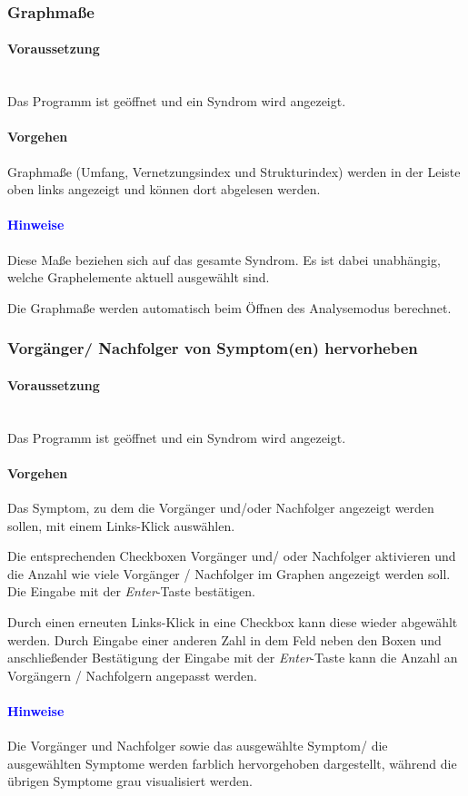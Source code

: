 \documentclass[enabledeprecatedfontcommands,fontsize=11pt,paper=a4,twoside]{scrartcl}
\newcounter{one}
\newcounter{two}[one]
\newcommand*{\hint}{\paragraph{\textcolor{blue}{Hinweise}}}
\newcommand*{\condition}{\paragraph{Voraussetzung}$\;$ \vspace{0.2cm}\\}
\newcommand*{\action}{\paragraph{Vorgehen}}
\let\tempone\itemize
\let\temptwo\enditemize
\renewenvironment{itemize}{\tempone\addtolength{\itemsep}{-10.0pt}}{\temptwo}
\let\origenumerate\enumerate
\let\origendenumerate\endenumerate
\renewenvironment{enumerate}{\origenumerate \addtolength{\itemsep}{-10.0pt}}{\origendenumerate}
\begin{document}
\newpage
\subsubsection{Graphmaße} 
	\condition 
	Das Programm ist geöffnet und ein Syndrom wird angezeigt.
	\action
	\begin{enumerate}
		\item Graphmaße (Umfang, Vernetzungsindex und Strukturindex) werden in der Leiste oben links angezeigt und können dort abgelesen werden.
	\end{enumerate} 
	\hint
	\begin{itemize}
		\item Diese Maße beziehen sich auf das gesamte Syndrom. Es ist dabei unabhängig, welche Graphelemente aktuell ausgewählt sind.
		\item Die Graphmaße werden automatisch beim Öffnen des Analysemodus berechnet. \\
	\end{itemize}

\newpage
\subsubsection{Vorgänger/ Nachfolger von Symptom(en) hervorheben}
	\condition 
		Das Programm ist geöffnet und ein Syndrom wird angezeigt.
	\action
	\begin{enumerate}
		\item Das Symptom, zu dem die Vorgänger und/oder Nachfolger angezeigt werden sollen, mit einem Links-Klick auswählen.
		\item Die entsprechenden Checkboxen Vorgänger und/ oder Nachfolger aktivieren und die Anzahl wie viele Vorgänger / Nachfolger im Graphen angezeigt werden soll. Die Eingabe mit der \textit{Enter}-Taste bestätigen.
		\item Durch einen erneuten Links-Klick in eine Checkbox kann diese wieder abgewählt werden. Durch Eingabe einer anderen Zahl in dem Feld neben den Boxen und anschließender Bestätigung der Eingabe mit der \textit{Enter}-Taste kann die Anzahl an Vorgängern / Nachfolgern angepasst werden.
	\end{enumerate} 
	\hint
	\begin{itemize}
		\item Die Vorgänger und Nachfolger sowie das ausgewählte Symptom/ die ausgewählten Symptome werden farblich hervorgehoben dargestellt, während die übrigen Symptome grau visualisiert werden. \\
	\end{itemize}
\end{document}
